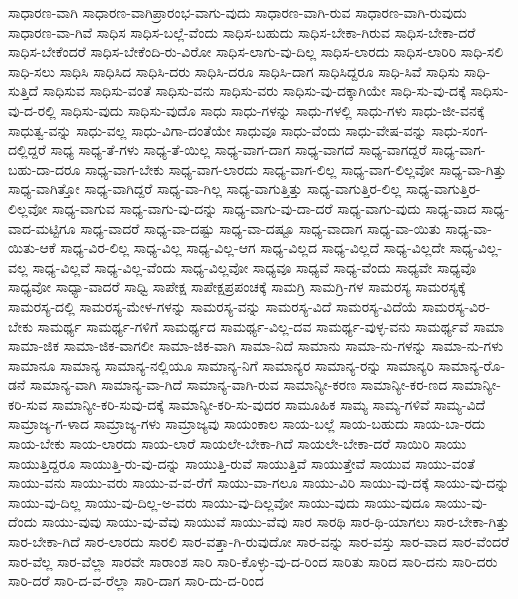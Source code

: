 {ಸಾಧಾರಣ-ವಾಗಿ
ಸಾಧಾರಣ-ವಾಗಿಪ್ರಾರಂಭ-ವಾಗು-ವುದು
ಸಾಧಾರಣ-ವಾಗಿ-ರುವ
ಸಾಧಾರಣ-ವಾಗಿ-ರುವುದು
ಸಾಧಾರಣ-ವಾ-ಗಿವೆ
ಸಾಧಿಸ
ಸಾಧಿಸ-ಬಲ್ಲೆ-ವೆಂದು
ಸಾಧಿಸ-ಬಹುದು
ಸಾಧಿಸ-ಬೇಕಾ-ಗಿರುವ
ಸಾಧಿಸ-ಬೇಕಾ-ದರೆ
ಸಾಧಿಸ-ಬೇಕೆಂದರೆ
ಸಾಧಿಸ-ಬೇಕೆಂದಿ-ರು-ವಿರೋ
ಸಾಧಿಸ-ಲಾಗು-ವು-ದಿಲ್ಲ
ಸಾಧಿಸ-ಲಾರದು
ಸಾಧಿಸ-ಲಾರಿರಿ
ಸಾಧಿ-ಸಲಿ
ಸಾಧಿ-ಸಲು
ಸಾಧಿಸಿ
ಸಾಧಿಸಿದ
ಸಾಧಿಸಿ-ದರು
ಸಾಧಿಸಿ-ದರೂ
ಸಾಧಿಸಿ-ದಾಗ
ಸಾಧಿಸಿದ್ದರೂ
ಸಾಧಿ-ಸಿವೆ
ಸಾಧಿಸು
ಸಾಧಿ-ಸುತ್ತಿದೆ
ಸಾಧಿಸುವ
ಸಾಧಿಸು-ವಂತೆ
ಸಾಧಿಸು-ವನು
ಸಾಧಿಸು-ವರು
ಸಾಧಿಸು-ವು-ದಕ್ಕಾಗಿಯೇ
ಸಾಧಿ-ಸು-ವು-ದಕ್ಕೆ
ಸಾಧಿಸು-ವು-ದ-ರಲ್ಲಿ
ಸಾಧಿಸು-ವುದು
ಸಾಧಿಸು-ವುದೊ
ಸಾಧು
ಸಾಧು-ಗಳನ್ನು
ಸಾಧು-ಗಳಲ್ಲಿ
ಸಾಧು-ಗಳು
ಸಾಧು-ಜೀ-ವನಕ್ಕೆ
ಸಾಧುತ್ವ-ವನ್ನು
ಸಾಧು-ವಲ್ಲ
ಸಾಧು-ವಿಗಾ-ದಂತೆಯೇ
ಸಾಧುವೂ
ಸಾಧು-ವೆಂದು
ಸಾಧು-ವೇಷ-ವನ್ನು
ಸಾಧು-ಸಂಗ-ದಲ್ಲಿದ್ದರೆ
ಸಾಧ್ಯ
ಸಾಧ್ಯ-ತೆ-ಗಳು
ಸಾಧ್ಯ-ತೆ-ಯಿಲ್ಲ
ಸಾಧ್ಯ-ವಾಗ-ದಾಗ
ಸಾಧ್ಯ-ವಾಗದೆ
ಸಾಧ್ಯ-ವಾಗದ್ದರೆ
ಸಾಧ್ಯ-ವಾಗ-ಬಹು-ದಾ-ದರೂ
ಸಾಧ್ಯ-ವಾಗ-ಬೇಕು
ಸಾಧ್ಯ-ವಾಗ-ಲಾರದು
ಸಾಧ್ಯ-ವಾಗ-ಲಿಲ್ಲ
ಸಾಧ್ಯ-ವಾಗ-ಲಿಲ್ಲವೋ
ಸಾಧ್ಯ-ವಾ-ಗಿತ್ತು
ಸಾಧ್ಯ-ವಾಗಿತ್ತೋ
ಸಾಧ್ಯ-ವಾಗಿದ್ದರೆ
ಸಾಧ್ಯ-ವಾ-ಗಿಲ್ಲ
ಸಾಧ್ಯ-ವಾಗುತ್ತಿತ್ತು
ಸಾಧ್ಯ-ವಾಗುತ್ತಿರ-ಲಿಲ್ಲ
ಸಾಧ್ಯ-ವಾಗುತ್ತಿರ-ಲಿಲ್ಲವೋ
ಸಾಧ್ಯ-ವಾಗುವ
ಸಾಧ್ಯ-ವಾಗು-ವು-ದನ್ನು
ಸಾಧ್ಯ-ವಾಗು-ವು-ದಾ-ದರೆ
ಸಾಧ್ಯ-ವಾಗು-ವುದು
ಸಾಧ್ಯ-ವಾದ
ಸಾಧ್ಯ-ವಾದ-ಮಟ್ಟಿಗೂ
ಸಾಧ್ಯ-ವಾದರೆ
ಸಾಧ್ಯ-ವಾ-ದಷ್ಟು
ಸಾಧ್ಯ-ವಾ-ದಷ್ಟೂ
ಸಾಧ್ಯ-ವಾದಾಗ
ಸಾಧ್ಯ-ವಾ-ಯಿತು
ಸಾಧ್ಯ-ವಾ-ಯಿತು-ಆಕೆ
ಸಾಧ್ಯ-ವಿರ-ಲಿಲ್ಲ
ಸಾಧ್ಯ-ವಿಲ್ಲ
ಸಾಧ್ಯ-ವಿಲ್ಲ-ಆಗ
ಸಾಧ್ಯ-ವಿಲ್ಲದ
ಸಾಧ್ಯ-ವಿಲ್ಲದೆ
ಸಾಧ್ಯ-ವಿಲ್ಲದೇ
ಸಾಧ್ಯ-ವಿಲ್ಲ-ವಲ್ಲ
ಸಾಧ್ಯ-ವಿಲ್ಲವೆ
ಸಾಧ್ಯ-ವಿಲ್ಲ-ವೆಂದು
ಸಾಧ್ಯ-ವಿಲ್ಲವೋ
ಸಾಧ್ಯವೂ
ಸಾಧ್ಯವೆ
ಸಾಧ್ಯ-ವೆಂದು
ಸಾಧ್ಯವೇ
ಸಾಧ್ಯವೊ
ಸಾಧ್ಯವೋ
ಸಾಧ್ಯಾ-ವಾದರೆ
ಸಾಧ್ವಿ
ಸಾಪೇಕ್ಷ
ಸಾಪೇಕ್ಷಪ್ರಪಂಚಕ್ಕೆ
ಸಾಮಗ್ರಿ
ಸಾಮಗ್ರಿ-ಗಳ
ಸಾಮರಸ್ಯ
ಸಾಮರಸ್ಯಕ್ಕೆ
ಸಾಮರಸ್ಯ-ದಲ್ಲಿ
ಸಾಮರಸ್ಯ-ಮೇಳ-ಗಳನ್ನು
ಸಾಮರಸ್ಯ-ವನ್ನು
ಸಾಮರಸ್ಯ-ವಿದೆ
ಸಾಮರಸ್ಯ-ವಿದೆಯೆ
ಸಾಮರಸ್ಯ-ವಿರ-ಬೇಕು
ಸಾಮರ್ಥ್ಯ
ಸಾಮರ್ಥ್ಯ-ಗಳಿಗೆ
ಸಾಮರ್ಥ್ಯದ
ಸಾಮರ್ಥ್ಯ-ವಿಲ್ಲ-ದವ
ಸಾಮರ್ಥ್ಯ-ವುಳ್ಳ-ವನು
ಸಾಮರ್ಥ್ಯವೆ
ಸಾಮಾ
ಸಾಮಾ-ಜಿಕ
ಸಾಮಾ-ಜಿಕ-ವಾಗಲೀ
ಸಾಮಾ-ಜಿಕ-ವಾಗಿ
ಸಾಮಾ-ನಿದೆ
ಸಾಮಾನು
ಸಾಮಾ-ನು-ಗಳನ್ನು
ಸಾಮಾ-ನು-ಗಳು
ಸಾಮಾನೂ
ಸಾಮಾನ್ಯ
ಸಾಮಾನ್ಯ-ನಲ್ಲಿಯೂ
ಸಾಮಾನ್ಯ-ನಿಗೆ
ಸಾಮಾನ್ಯರ
ಸಾಮಾನ್ಯ-ರನ್ನು
ಸಾಮಾನ್ಯರಿ
ಸಾಮಾನ್ಯ-ರೊ-ಡನೆ
ಸಾಮಾನ್ಯ-ವಾಗಿ
ಸಾಮಾನ್ಯ-ವಾ-ಗಿದೆ
ಸಾಮಾನ್ಯ-ವಾಗಿ-ರುವ
ಸಾಮಾನ್ಯೀ-ಕರಣ
ಸಾಮಾನ್ಯೀ-ಕರ-ಣದ
ಸಾಮಾನ್ಯೀ-ಕರಿ-ಸುವ
ಸಾಮಾನ್ಯೀ-ಕರಿ-ಸುವು-ದಕ್ಕೆ
ಸಾಮಾನ್ಯೀ-ಕರಿ-ಸು-ವುದರ
ಸಾಮೂಹಿಕ
ಸಾಮ್ಯ
ಸಾಮ್ಯ-ಗಳಿವೆ
ಸಾಮ್ಯ-ವಿದೆ
ಸಾಮ್ರಾಜ್ಯ-ಗ-ಳಾದ
ಸಾಮ್ರಾಜ್ಯ-ಗಳು
ಸಾಮ್ರಾಜ್ಯವು
ಸಾಯಂಕಾಲ
ಸಾಯ-ಬಲ್ಲೆ
ಸಾಯ-ಬಹುದು
ಸಾಯ-ಬಾ-ರದು
ಸಾಯ-ಬೇಕು
ಸಾಯ-ಲಾರದು
ಸಾಯ-ಲಾರೆ
ಸಾಯಲೇ-ಬೇಕಾ-ಗಿದೆ
ಸಾಯಲೇ-ಬೇಕಾ-ದರೆ
ಸಾಯಿರಿ
ಸಾಯು
ಸಾಯುತ್ತಿದ್ದರೂ
ಸಾಯುತ್ತಿ-ರು-ವು-ದನ್ನು
ಸಾಯುತ್ತಿ-ರುವೆ
ಸಾಯುತ್ತಿವೆ
ಸಾಯುತ್ತೇವೆ
ಸಾಯುವ
ಸಾಯು-ವಂತೆ
ಸಾಯು-ವನು
ಸಾಯು-ವರು
ಸಾಯು-ವ-ವ-ರೆಗೆ
ಸಾಯು-ವಾ-ಗಲೂ
ಸಾಯು-ವಿರಿ
ಸಾಯು-ವು-ದಕ್ಕೆ
ಸಾಯು-ವು-ದನ್ನು
ಸಾಯು-ವು-ದಿಲ್ಲ
ಸಾಯು-ವು-ದಿಲ್ಲ-ಅ-ವರು
ಸಾಯು-ವು-ದಿಲ್ಲವೋ
ಸಾಯು-ವುದು
ಸಾಯು-ವುದೂ
ಸಾಯು-ವು-ದೆಂದು
ಸಾಯು-ವುವು
ಸಾಯು-ವು-ವೆವು
ಸಾಯುವೆ
ಸಾಯು-ವೆವು
ಸಾರ
ಸಾರಥಿ
ಸಾರ-ಥಿ-ಯಾಗಲು
ಸಾರ-ಬೇಕಾ-ಗಿತ್ತು
ಸಾರ-ಬೇಕಾ-ಗಿದೆ
ಸಾರ-ಲಾರದು
ಸಾರಲಿ
ಸಾರ-ವತ್ತಾ-ಗಿ-ರುವುದೋ
ಸಾರ-ವನ್ನು
ಸಾರ-ವಸ್ತು
ಸಾರ-ವಾದ
ಸಾರ-ವೆಂದರೆ
ಸಾರ-ವೆಲ್ಲ
ಸಾರ-ವೆಲ್ಲಾ
ಸಾರವೇ
ಸಾರಾಂಶ
ಸಾರಿ
ಸಾರಿ-ಕೊಳ್ಳು-ವು-ದ-ರಿಂದ
ಸಾರಿತು
ಸಾರಿದ
ಸಾರಿ-ದನು
ಸಾರಿ-ದರು
ಸಾರಿ-ದರೆ
ಸಾರಿ-ದ-ವ-ರೆಲ್ಲಾ
ಸಾರಿ-ದಾಗ
ಸಾರಿ-ದು-ದ-ರಿಂದ
}
